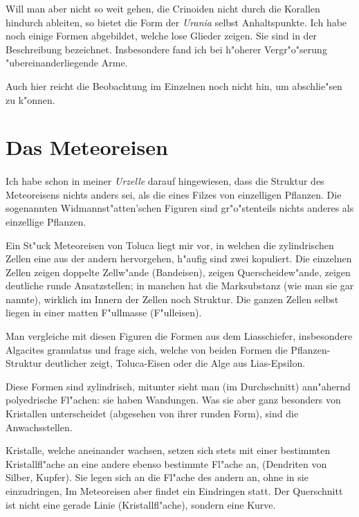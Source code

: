 \documentclass[a4paper, 11pt, oneside]{article}
\begin{document}
Will man aber nicht so weit gehen, die Crinoiden nicht durch die Korallen hindurch ableiten, so bietet die Form der \emph{Urania} selbst Anhaltspunkte. Ich habe noch einige Formen abgebildet, welche lose Glieder zeigen. Sie sind in der Beschreibung bezeichnet. Insbesondere fand ich bei h"oherer Vergr"o"serung "ubereinanderliegende Arme.

Auch hier reicht die Beobachtung im Einzelnen noch nicht hin, um abschlie"sen zu k"onnen.
\clearpage
\section{Das Meteoreisen}
\paragraph{}
Ich habe schon in meiner \emph{Urzelle} darauf hingewiesen, dass die Struktur des Meteoreisens nichts anders sei, als die eines Filzes von einzelligen Pflanzen. Die sogenannten Widmannst"atten'schen Figuren sind gr"o"stenteils nichts anderes als einzellige Pflanzen.

Ein St"uck Meteoreisen von Toluca liegt mir vor, in welchen die zylindrischen Zellen eine aus der andern hervorgehen, h"aufig sind zwei kopuliert. Die einzelnen Zellen zeigen doppelte Zellw"ande (Bandeisen), zeigen Querscheidew"ande, zeigen deutliche runde Ansatzstellen; in manchen hat die Marksubstanz (wie man sie gar nannte), wirklich im Innern der Zellen noch Struktur. Die ganzen Zellen selbst liegen in einer matten F"ullmasse (F"ulleisen).

Man vergleiche mit diesen Figuren die Formen aus dem Liasschiefer, insbesondere Algacites granulatus und frage sich, welche von beiden Formen die Pflanzen-Struktur deutlicher zeigt, Toluca-Eisen oder die Alge aus Lias-Epsilon.

Diese Formen sind zylindrisch, mitunter sieht man (im Durchschnitt) ann"ahernd polyedrische Fl"achen: sie haben Wandungen. Was sie aber ganz besonders von Kristallen unterscheidet (abgesehen von ihrer runden Form), sind die Anwachsstellen.

Kristalle, welche aneinander wachsen, setzen sich stets mit einer bestimmten Kristallfl"ache an eine andere ebenso bestimmte Fl"ache an, (Dendriten von Silber, Kupfer). Sie legen sich an die Fl"ache des andern an, ohne in sie einzudringen, Im Meteoreisen aber findet ein Eindringen statt. Der Querschnitt ist nicht eine gerade Linie (Kristallfl"ache), sondern eine Kurve.
\end{document}
